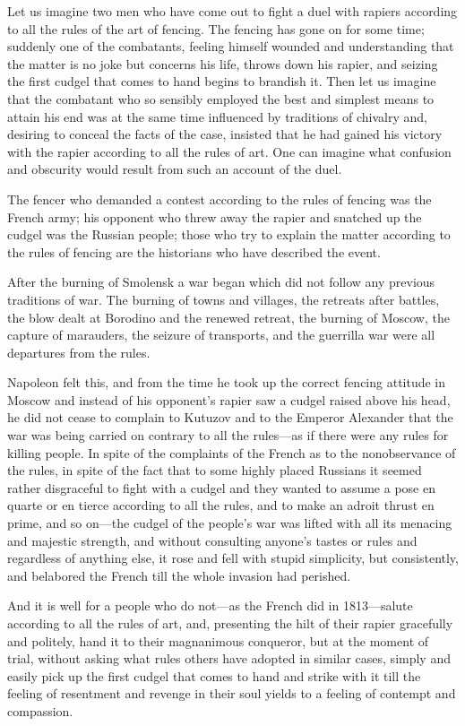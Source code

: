 Let us imagine two men who have come out to fight a duel with
rapiers according to all the rules of the art of fencing. The
fencing has gone on for some time; suddenly one of the
combatants, feeling himself wounded and understanding that the
matter is no joke but concerns his life, throws down his rapier,
and seizing the first cudgel that comes to hand begins to
brandish it. Then let us imagine that the combatant who so
sensibly employed the best and simplest means to attain his end
was at the same time influenced by traditions of chivalry and,
desiring to conceal the facts of the case, insisted that he had
gained his victory with the rapier according to all the rules of
art. One can imagine what confusion and obscurity would result
from such an account of the duel.

The fencer who demanded a contest according to the rules of
fencing was the French army; his opponent who threw away the
rapier and snatched up the cudgel was the Russian people; those
who try to explain the matter according to the rules of fencing
are the historians who have described the event.

After the burning of Smolensk a war began which did not follow
any previous traditions of war. The burning of towns and
villages, the retreats after battles, the blow dealt at Borodino
and the renewed retreat, the burning of Moscow, the capture of
marauders, the seizure of transports, and the guerrilla war were
all departures from the rules.

Napoleon felt this, and from the time he took up the correct
fencing attitude in Moscow and instead of his opponent's rapier
saw a cudgel raised above his head, he did not cease to complain
to Kutuzov and to the Emperor Alexander that the war was being
carried on contrary to all the rules---as if there were any rules
for killing people. In spite of the complaints of the French as
to the nonobservance of the rules, in spite of the fact that to
some highly placed Russians it seemed rather disgraceful to fight
with a cudgel and they wanted to assume a pose en quarte or en
tierce according to all the rules, and to make an adroit thrust
en prime, and so on---the cudgel of the people's war was lifted
with all its menacing and majestic strength, and without
consulting anyone's tastes or rules and regardless of anything
else, it rose and fell with stupid simplicity, but consistently,
and belabored the French till the whole invasion had perished.

And it is well for a people who do not---as the French did in
1813---salute according to all the rules of art, and, presenting
the hilt of their rapier gracefully and politely, hand it to
their magnanimous conqueror, but at the moment of trial, without
asking what rules others have adopted in similar cases, simply
and easily pick up the first cudgel that comes to hand and strike
with it till the feeling of resentment and revenge in their soul
yields to a feeling of contempt and compassion.


